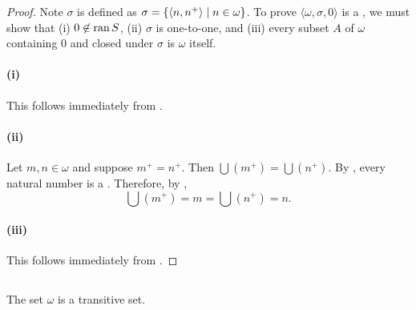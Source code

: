 \documentclass{report}
\begin{document}
  \begin{proof}

    Note $\sigma$ is defined as $\sigma = \{\left< n, n^+ \right> \mid n \in \omega\}$.
    To prove $\langle \omega, \sigma, 0 \rangle$ is a
      , we must show that (i) $0 \not\in \mathop{\text{ran}}{S}$,
      (ii) $\sigma$ is one-to-one, and (iii) every subset $A$ of $\omega$
      containing $0$ and closed under $\sigma$ is $\omega$ itself.

    \paragraph{(i)}%

      This follows immediately from .

    \paragraph{(ii)}%

      Let $m, n \in \omega$ and suppose $m^+ = n^+$.
      Then $\bigcup \left(m^+\right) = \bigcup \left(n^+\right)$.
      By , every natural number is a
        .
      Therefore, by ,
        $$\bigcup \left(m^+\right) = m = \bigcup \left(n^+\right) = n.$$

    \paragraph{(iii)}%

      This follows immediately from .

  \end{proof}

\subsection{}%

  \begin{theorem}[4G]
    The set $\omega$ is a transitive set.
  \end{theorem}
\end{document}

